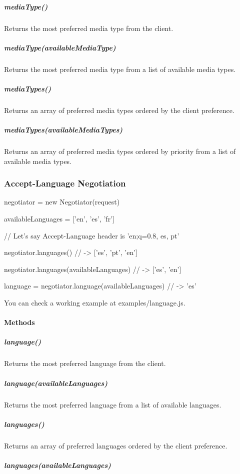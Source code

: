 \subparagraph*{media\+Type()}

Returns the most preferred media type from the client.

\subparagraph*{media\+Type(available\+Media\+Type)}

Returns the most preferred media type from a list of available media types.

\subparagraph*{media\+Types()}

Returns an array of preferred media types ordered by the client preference.

\subparagraph*{media\+Types(available\+Media\+Types)}

Returns an array of preferred media types ordered by priority from a list of available media types.

\subsubsection*{Accept-\/\+Language Negotiation}


\begin{DoxyCode}
negotiator = new Negotiator(request)

availableLanguages = ['en', 'es', 'fr']

// Let's say Accept-Language header is 'en;q=0.8, es, pt'

negotiator.languages()
// -> ['es', 'pt', 'en']

negotiator.languages(availableLanguages)
// -> ['es', 'en']

language = negotiator.language(availableLanguages)
// -> 'es'
\end{DoxyCode}


You can check a working example at {\ttfamily examples/language.\+js}.

\paragraph*{Methods}

\subparagraph*{language()}

Returns the most preferred language from the client.

\subparagraph*{language(available\+Languages)}

Returns the most preferred language from a list of available languages.

\subparagraph*{languages()}

Returns an array of preferred languages ordered by the client preference.

\subparagraph*{languages(available\+Languages)}

